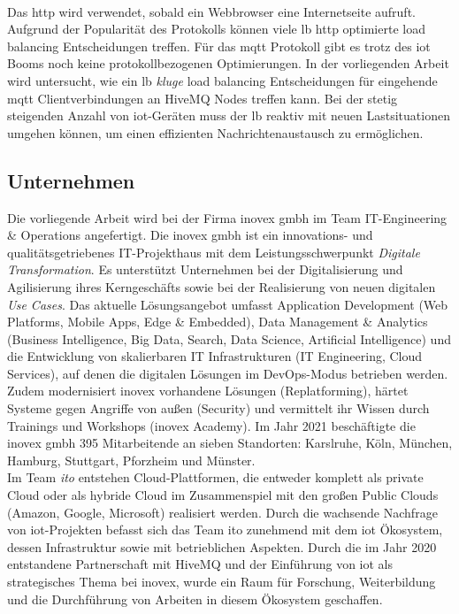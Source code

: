 \\
Das \ac{http} wird verwendet, sobald ein Webbrowser eine Internetseite aufruft. Aufgrund der Popularität des Protokolls können viele \acl{lb} \ac{http} optimierte load balancing Entscheidungen treffen.
Für das \ac{mqtt} Protokoll gibt es trotz des \ac{iot} Booms noch keine protokollbezogenen Optimierungen.
In der vorliegenden Arbeit wird untersucht, wie ein \acl{lb} \textit{kluge} load balancing Entscheidungen für eingehende \ac{mqtt} Clientverbindungen an HiveMQ Nodes treffen kann.
Bei der stetig steigenden Anzahl von \ac{iot}-Geräten muss der \acl{lb} reaktiv mit neuen Lastsituationen umgehen können, um einen effizienten Nachrichtenaustausch zu ermöglichen.

\subsection{Unternehmen}
Die vorliegende Arbeit wird bei der Firma inovex \acs{gmbh} im Team IT-Engineering \& Operations angefertigt.
Die inovex \acs{gmbh} ist ein innovations- und qualitätsgetriebenes IT-Projekthaus mit dem Leistungsschwerpunkt \textit{Digitale Transformation}.
Es unterstützt Unternehmen bei der Digitalisierung und Agilisierung ihres Kerngeschäfts sowie bei der Realisierung von neuen digitalen \textit{Use Cases}.
Das aktuelle Lösungsangebot umfasst Application Development (Web Platforms, Mobile Apps, Edge \& Embedded), Data Management \& Analytics (Business Intelligence, Big Data, Search, Data Science, Artificial Intelligence) und die Entwicklung von skalierbaren IT Infrastrukturen (IT Engineering, Cloud Services), auf denen die digitalen Lösungen im DevOps-Modus betrieben werden.
Zudem modernisiert inovex vorhandene Lösungen (Replatforming), härtet Systeme gegen Angriffe von au{\ss}en (Security) und vermittelt ihr Wissen durch Trainings und Workshops (inovex Academy).
Im Jahr 2021 beschäftigte die inovex \acs{gmbh} 395 Mitarbeitende an sieben Standorten: Karslruhe, Köln, München, Hamburg, Stuttgart, Pforzheim und Münster.
\\
Im Team \textit{\ac{ito}} entstehen Cloud-Plattformen, die entweder komplett als private Cloud oder als hybride Cloud im Zusammenspiel mit den gro{\ss}en Public Clouds (Amazon, Google, Microsoft) realisiert werden.
Durch die wachsende Nachfrage von \acs{iot}-Projekten befasst sich das Team \ac{ito} zunehmend mit dem \acl{iot} Ökosystem, dessen Infrastruktur sowie mit betrieblichen Aspekten.
Durch die im Jahr 2020 entstandene Partnerschaft mit HiveMQ und der Einführung von \ac{iot} als strategisches Thema bei inovex, wurde ein Raum für Forschung, Weiterbildung und die Durchführung von Arbeiten in diesem Ökosystem geschaffen.

